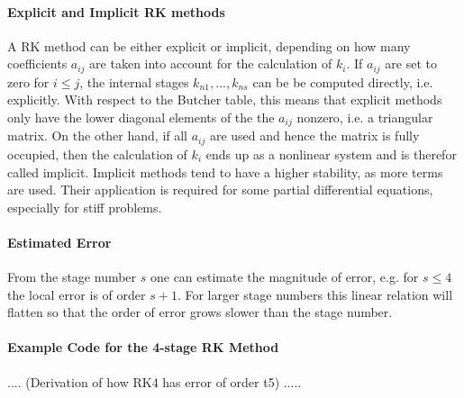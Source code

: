 \paragraph{Explicit and Implicit RK methods}
A RK method can be either explicit or implicit, depending on how many coefficients $a_{ij}$ are taken into account for the calculation of $k_i$.
If $a_{ij}$ are set to zero for $i \leq j$, the internal stages $k_{n1},..., k_{ns}$ can be be computed directly, i.e. explicitly.
With respect to the Butcher table, this means that explicit methods only have the lower diagonal elements of the the $a_{ij}$ nonzero, i.e. a triangular matrix.
On the other hand, if all $a_{ij}$ are used and hence the matrix is fully occupied,
then the calculation of $k_i$ ends up as a nonlinear system and is therefor called implicit. Implicit methods tend to have a higher stability, as more terms are used. Their application is required for some partial differential equations, especially for stiff problems. %


\paragraph{Estimated Error}
From the stage number $s$ one can estimate the magnitude of error, e.g. for $s \leq 4$ the local error is of order $s +1$.
For larger stage numbers this linear relation will flatten so that the order of error grows slower than the stage number.


\paragraph{Example Code for the 4-stage RK Method}

....
(Derivation of how RK4 has error of order t5)
.....


